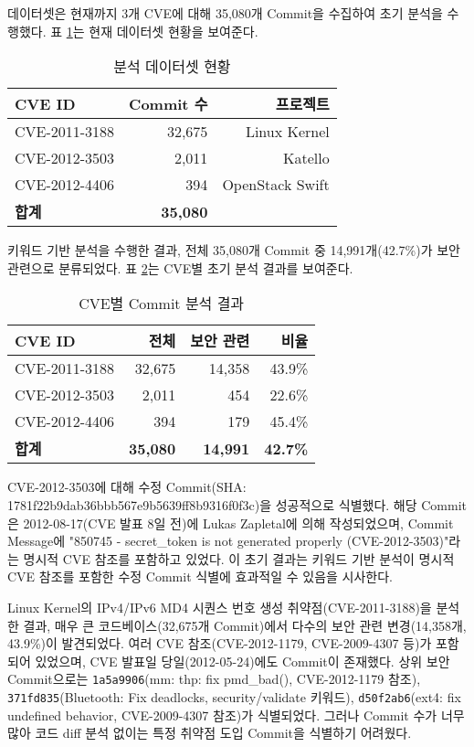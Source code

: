 ﻿\documentclass[conference]{IEEEtran}
\begin{document}
데이터셋은 현재까지 3개 CVE에 대해 35,080개 Commit을 수집하여 초기 분석을 수행했다. 표 \ref{tab:dataset}는 현재 데이터셋 현황을 보여준다.

\begin{table}[h]
\centering
\caption{분석 데이터셋 현황}
\label{tab:dataset}
\begin{tabular}{lrr}
\toprule
\textbf{CVE ID} & \textbf{Commit 수} & \textbf{프로젝트} \\
\midrule
CVE-2011-3188 & 32,675 & Linux Kernel \\
CVE-2012-3503 & 2,011 & Katello \\
CVE-2012-4406 & 394 & OpenStack Swift \\
\midrule
\textbf{합계} & \textbf{35,080} & \\
\bottomrule
\end{tabular}
\end{table}

키워드 기반 분석을 수행한 결과, 전체 35,080개 Commit 중 14,991개(42.7\%)가 보안 관련으로 분류되었다. 표 \ref{tab:commit_analysis}는 CVE별 초기 분석 결과를 보여준다.

\begin{table}[!htbp]
\centering
\caption{CVE별 Commit 분석 결과}
\label{tab:commit_analysis}
\begin{tabular}{lrrr}
\toprule
\textbf{CVE ID} & \textbf{전체} & \textbf{보안 관련} & \textbf{비율} \\
\midrule
CVE-2011-3188 & 32,675 & 14,358 & 43.9\% \\
CVE-2012-3503 & 2,011 & 454 & 22.6\% \\
CVE-2012-4406 & 394 & 179 & 45.4\% \\
\midrule
\textbf{합계} & \textbf{35,080} & \textbf{14,991} & \textbf{42.7\%} \\
\bottomrule
\end{tabular}
\end{table}

CVE-2012-3503에 대해 수정 Commit(SHA: 1781f22b9dab36bbb567e9b5639ff8b9316f0f3c)을 성공적으로 식별했다. 해당 Commit은 2012-08-17(CVE 발표 8일 전)에 Lukas Zapletal에 의해 작성되었으며, Commit Message에 "850745 - secret\_token is not generated properly (CVE-2012-3503)"라는 명시적 CVE 참조를 포함하고 있었다. 이 초기 결과는 키워드 기반 분석이 명시적 CVE 참조를 포함한 수정 Commit 식별에 효과적일 수 있음을 시사한다.

Linux Kernel의 IPv4/IPv6 MD4 시퀀스 번호 생성 취약점(CVE-2011-3188)을 분석한 결과, 매우 큰 코드베이스(32,675개 Commit)에서 다수의 보안 관련 변경(14,358개, 43.9\%)이 발견되었다. 여러 CVE 참조(CVE-2012-1179, CVE-2009-4307 등)가 포함되어 있었으며, CVE 발표일 당일(2012-05-24)에도 Commit이 존재했다. 상위 보안 Commit으로는 \texttt{1a5a9906}(mm: thp: fix pmd\_bad(), CVE-2012-1179 참조), \texttt{371fd835}(Bluetooth: Fix deadlocks, security/validate 키워드), \texttt{d50f2ab6}(ext4: fix undefined behavior, CVE-2009-4307 참조)가 식별되었다. 그러나 Commit 수가 너무 많아 코드 diff 분석 없이는 특정 취약점 도입 Commit을 식별하기 어려웠다.
\end{document}
